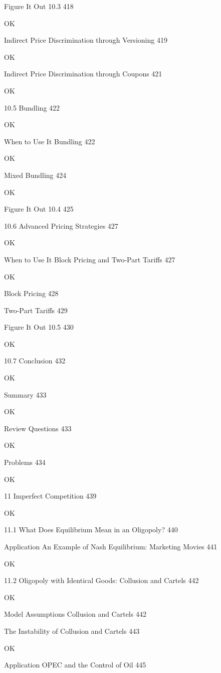 Figure It Out 10.3 418

OK

Indirect Price Discrimination through Versioning 419

OK

Indirect Price Discrimination through Coupons 421

OK

10.5 Bundling 422

OK

When to Use It Bundling 422

OK

Mixed Bundling 424

OK

Figure It Out 10.4 425



10.6 Advanced Pricing Strategies 427

OK

When to Use It Block Pricing and Two-Part Tariffs 427

OK

Block Pricing 428



Two-Part Tariffs 429



Figure It Out 10.5 430

OK

10.7 Conclusion 432

OK

Summary 433

OK

Review Questions 433

OK

Problems 434

OK

11 Imperfect Competition 439

OK

11.1 What Does Equilibrium Mean in an Oligopoly? 440



Application An Example of Nash Equilibrium: Marketing Movies 441

OK

11.2 Oligopoly with Identical Goods: Collusion and Cartels 442

OK

Model Assumptions Collusion and Cartels 442



The Instability of Collusion and Cartels 443

OK

Application OPEC and the Control of Oil 445



